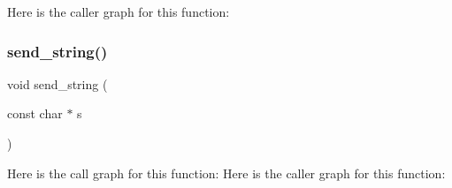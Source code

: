 Here is the caller graph for this function\+:
\mbox{\label{_pelt__uart_8c_a9161f57780d037622c9697e56fffe3e5}} 
\subsubsection{send\+\_\+string()}
{\footnotesize\ttfamily void send\+\_\+string (\begin{DoxyParamCaption}\item[{const char $\ast$}]{s }\end{DoxyParamCaption})}

Here is the call graph for this function\+:
Here is the caller graph for this function\+:
